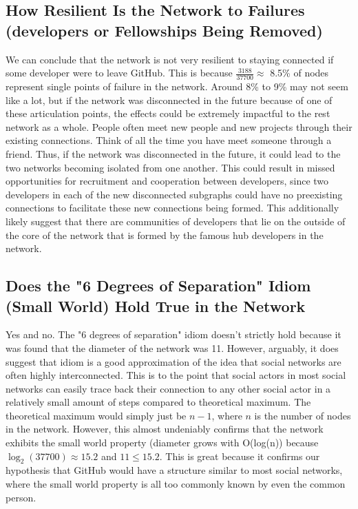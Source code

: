 \documentclass[9pt,twocolumn,twoside]{pnas-new}
\begin{document}
\subsection{How Resilient Is the Network to Failures (developers or Fellowships Being Removed)}

We can conclude that the network is not very resilient to staying connected if some developer were to leave GitHub. This is because $\frac{3188}{37700} \approx$ 8.5\% of nodes represent single points of failure in the network. Around 8\% to 9\% may not seem like a lot, but if the network was disconnected in the future because of one of these articulation points, the effects could be extremely impactful to the rest network as a whole. People often meet new people and new projects through their existing connections. Think of all the time you have meet someone through a friend. Thus, if the network was disconnected in the future, it could lead to the two networks becoming isolated from one another. This could result in missed opportunities for recruitment and cooperation between developers, since two developers in each of the new disconnected subgraphs could have no preexisting connections to facilitate these new connections being formed. This additionally likely suggest that there are communities of developers that lie on the outside of the core of the network that is formed by the famous hub developers in the network.

\subsection{Does the "6 Degrees of Separation" Idiom (Small World) Hold True in the Network}

Yes and no. The "6 degrees of separation" idiom doesn't strictly hold because it was found that the diameter of the network was 11. However, arguably, it does suggest that idiom is a good approximation of the idea that social networks are often highly interconnected. This is to the point that social actors in most social networks can easily trace back their connection to any other social actor in a relatively small amount of steps compared to theoretical maximum. The theoretical maximum would simply just be $n-1$, where $n$ is the number of nodes in the network. However, this almost undeniably confirms that the network exhibits the small world property (diameter grows with O(log(n)) because $\log_{2}\left(37700\right) \approx 15.2$ and $11 \le 15.2$. This is great because it confirms our hypothesis that GitHub would have a structure similar to most social networks, where the small world property is all too commonly known by even the common person.
\end{document}
